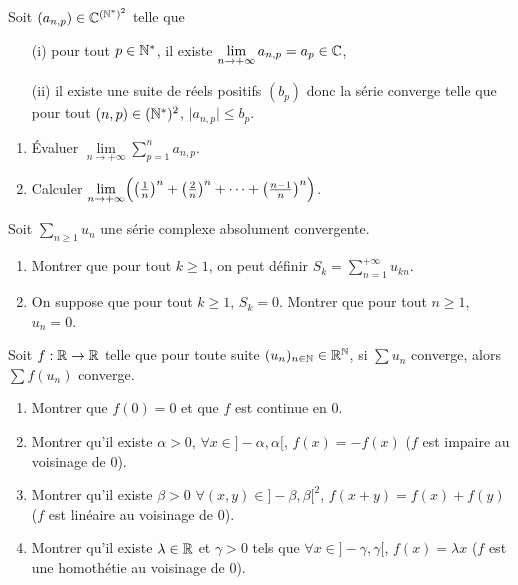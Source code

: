 \begin{exercise}
	Soit $(a_{n,p})\in\mathbb{C}^{(\mathbb{N}^{*})^{2}}$ telle que 
	\begin{enumerate}
		\item
		[(i)] pour tout $p\in\mathbb{N}^{*}$, il existe
		$\lim\limits_{n\to+\infty}a_{n,p}=a_{p}\in\mathbb{C}$,
		\item
		[(ii)] il existe une suite de réels positifs $(b_{p})$ donc la série
		converge telle que pour tout $(n,p)\in(\mathbb{N}^{*})^{2}$, $\lvert
		a_{n,p}\rvert\leqslant b_{p}$.
		
	\end{enumerate}
	\begin{enumerate}
		\item
		Évaluer $\lim\limits_{n\to+\infty}\sum_{p=1}^{n}a_{n,p}$.
		\item
		Calculer
		$\lim\limits_{n\to+\infty}\Bigl(\bigl(\frac{1}{n}\bigr)^{n}+\bigl(\frac{2}{n}\bigr)^{n}+\dots+\bigl(\frac{n-1}{n}\bigr)^{n}\Bigr)$.
	\end{enumerate}
\end{exercise}

\begin{exercise}
	Soit $\sum_{n\geqslant1}u_{n}$ une série complexe absolument convergente.
	\begin{enumerate}
		\item
		Montrer que pour tout $k\geqslant1$, on peut définir
		$S_{k}=\sum_{n=1}^{+\infty}u_{kn}$.
		\item
		On suppose que pour tout $k\geqslant1$, $S_{k}=0$. Montrer que pour tout
		$n\geqslant1$, $u_{n}=0$.
	\end{enumerate}
\end{exercise}

\begin{exercise}
	Soit $f:\mathbb{R}\to\mathbb{R}$ telle que pour toute suite $(u_{n})_{n\in\mathbb{N}}\in\mathbb{R}^{\mathbb{N}}$, si
$\sum u_{n}$ converge, alors $\sum f(u_{n})$ converge.
\begin{enumerate}
	\item
	Montrer que $f(0)=0$ et que $f$ est continue en 0.
	\item
	Montrer qu'il existe $\alpha>0$, $\forall x\in]-\alpha,\alpha[$, $f(x)=-f(x)$
	($f$ est impaire au voisinage de 0).
	\item
	Montrer qu'il existe $\beta>0$ $\forall(x,y)\in]-\beta,\beta[^{2}$,
	$f(x+y)=f(x)+f(y)$ ($f$ est linéaire au voisinage de 0).
	\item
	Montrer qu'il existe $\lambda\in\mathbb{R}$ et $\gamma>0$ tels que $\forall
	x\in]-\gamma,\gamma[$, $f(x)=\lambda x$ ($f$ est une homothétie au voisinage
	de 0).
\end{enumerate}
\end{exercise}